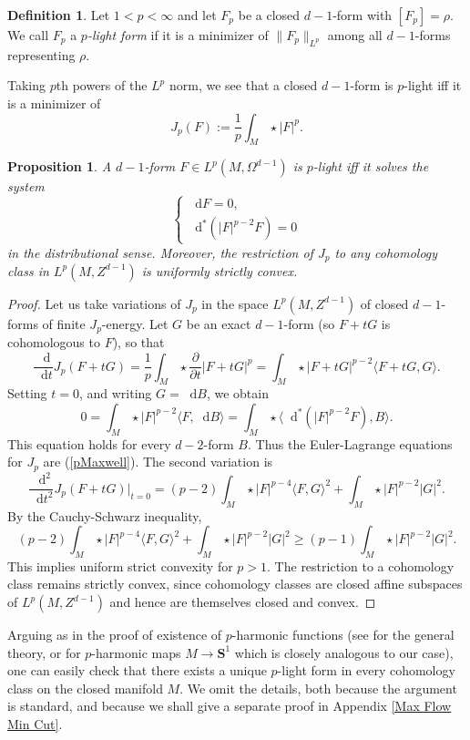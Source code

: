 \documentclass[reqno,11pt]{amsart}
\newcommand{\Sph}{\mathbf S}
\newcommand*\dif{\mathop{}\!\mathrm{d}}
\newcommand{\dfn}[1]{\emph{#1}\index{#1}}
\newtheorem{proposition}[theorem]{Proposition}
\theoremstyle{definition}
\newtheorem{definition}[theorem]{Definition}
\numberwithin{equation}{section}
\begin{document}
\begin{definition}
Let $1 < p < \infty$ and let $F_p$ be a closed $d - 1$-form with $[F_p] = \rho$.
We call $F_p$ a \dfn{$p$-light form} if it is a minimizer of $\|F_p\|_{L^p}$ among all $d - 1$-forms representing $\rho$.
\end{definition}

Taking $p$th powers of the $L^p$ norm, we see that a closed $d - 1$-form is $p$-light iff it is a minimizer of
$$J_p(F) := \frac{1}{p} \int_M \star |F|^p.$$

\begin{proposition}
A $d - 1$-form $F \in L^p(M, \Omega^{d - 1})$ is $p$-light iff it solves the system
\begin{equation}\label{pMaxwell}
\begin{cases}
	\dif F = 0, \\
	\dif^*(|F|^{p - 2} F) = 0
\end{cases}
\end{equation}
in the distributional sense. Moreover, the restriction of $J_p$ to any cohomology class in $L^p(M, Z^{d - 1})$ is uniformly strictly convex.
\end{proposition}
\begin{proof}
Let us take variations of $J_p$ in the space $L^p(M, Z^{d - 1})$ of closed $d-1$-forms of finite $J_p$-energy.
Let $G$ be an exact $d - 1$-form (so $F + tG$ is cohomologous to $F$), so that
$$\frac{\dif}{\dif t} J_p(F + tG) = \frac{1}{p} \int_M \star \frac{\partial}{\partial t} |F + tG|^p = \int_M \star |F + tG|^{p - 2} \langle F + tG, G\rangle.$$
Setting $t = 0$, and writing $G = \dif B$, we obtain 
$$0 = \int_M \star |F|^{p - 2} \langle F, \dif B\rangle = \int_M \star \langle \dif^*(|F|^{p - 2} F), B\rangle.$$
This equation holds for every $d - 2$-form $B$.
Thus the Euler-Lagrange equations for $J_p$ are (\ref{pMaxwell}).
The second variation is 
$$\frac{\dif^2}{\dif t^2} J_p(F + tG)\bigg|_{t = 0} = (p - 2) \int_M \star |F|^{p - 4} \langle F, G\rangle^2 + \int_M \star |F|^{p - 2} |G|^2.$$
By the Cauchy-Schwarz inequality,
$$(p - 2) \int_M \star |F|^{p - 4} \langle F, G\rangle^2 + \int_M \star |F|^{p - 2} |G|^2 \geq (p - 1) \int_M \star |F|^{p - 2} |G|^2.$$
This implies uniform strict convexity for $p > 1$.
The restriction to a cohomology class remains strictly convex, since cohomology classes are closed affine subspaces of $L^p(M, Z^{d - 1})$ and hence are themselves closed and convex.
\end{proof}

Arguing as in the proof of existence of $p$-harmonic functions (see \cite[\S8.2]{evans2010partial} for the general theory, or \cite[\S2.1]{daskalopoulos2020transverse} for $p$-harmonic maps $M \to \Sph^1$ which is closely analogous to our case), one can easily check that there exists a unique $p$-light form in every cohomology class on the closed manifold $M$.
We omit the details, both because the argument is standard, and because we shall give a separate proof in Appendix \ref{Max Flow Min Cut}.
\end{document}
